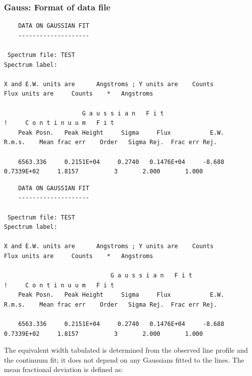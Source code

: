 
\subsubsection{\label{gaussform}Gauss: Format of data file}

\begin{htmlonly}
\begin{verbatim}
    DATA ON GAUSSIAN FIT
    --------------------

 Spectrum file: TEST
Spectrum label:

X and E.W. units are      Angstroms ; Y units are    Counts
Flux units are     Counts    *   Angstroms

                      G a u s s i a n   F i t                                               !     C o n t i n u u m   F i t
    Peak Posn.   Peak Height     Sigma     Flux           E.W.    R.m.s.    Mean frac err    Order   Sigma Rej.  Frac err Rej.

    6563.336     0.2151E+04     0.2740   0.1476E+04     -8.688  0.7339E+02     1.8157          3       2.000       1.000
\end{verbatim}
\end{htmlonly}

\begin{latexonly}
\begin{tiny}
\begin{verbatim}
    DATA ON GAUSSIAN FIT
    --------------------

 Spectrum file: TEST
Spectrum label:

X and E.W. units are      Angstroms ; Y units are    Counts
Flux units are     Counts    *   Angstroms

                              G a u s s i a n   F i t                                                        !     C o n t i n u u m   F i t
    Peak Posn.   Peak Height     Sigma     Flux           E.W.    R.m.s.    Mean frac err    Order   Sigma Rej.  Frac err Rej.

    6563.336     0.2151E+04     0.2740   0.1476E+04     -8.688  0.7339E+02     1.8157          3       2.000       1.000
\end{verbatim}
\end{tiny}
\end{latexonly}

The equivalent width tabulated is determined from the observed line
profile and the continuum fit; it does not depend on any Gaussians
fitted to the lines.
The mean fractional deviation is defined as:

